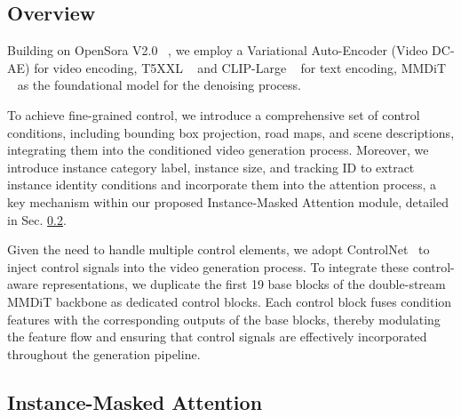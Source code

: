 \documentclass{article} %
\begin{document}
\subsection{Overview} 
\label{section:overview}
Building on OpenSora V2.0 ~\cite{peng2025opensora20trainingcommerciallevel}, we employ a Variational Auto-Encoder (Video DC-AE) for video encoding, T5XXL ~\cite{chung2024scaling} and CLIP-Large ~\cite{Radford2021LearningTV} for text encoding, MMDiT ~\cite{flux2024} as the foundational model for the denoising process.

To achieve fine-grained control, we introduce a comprehensive set of control conditions, including bounding box projection, road maps, and scene descriptions, integrating them into the conditioned video generation process.
Moreover, we introduce instance category label, instance size, and tracking ID to extract instance identity conditions and incorporate them into the attention process,
a key mechanism within our proposed Instance-Masked Attention module, detailed in Sec. \ref{section:attn}.

Given the need to handle multiple control elements, we adopt ControlNet~\cite{zhang2023adding} to inject control signals into the video generation process.
To integrate these control-aware representations, we duplicate the first 19 base blocks of the double-stream MMDiT backbone as dedicated control blocks.
Each control block fuses condition features with the corresponding outputs of the base blocks, thereby modulating the feature flow and ensuring that control signals are effectively incorporated throughout the generation pipeline.
 







\subsection{Instance-Masked Attention} 
\label{section:attn}
\end{document}
